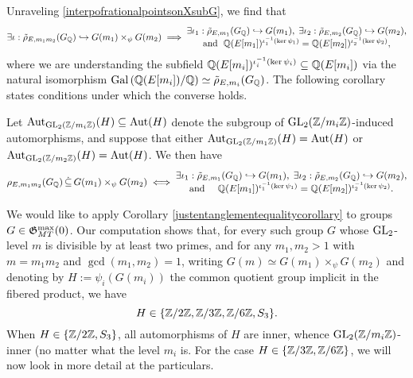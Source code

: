 Unraveling \eqref{interpofrationalpointsonXsubG}, we find that
\[
\exists \iota : \tilde{\rho}_{E,m_1m_2}(G_{\mathbb{Q}}) \hookrightarrow G(m_1) \times_\psi G(m_2) \; \Longrightarrow \; \begin{matrix} \exists \iota_1 : \tilde{\rho}_{E,m_1}(G_{\mathbb{Q}}) \hookrightarrow G(m_1), \; \exists \iota_2 : \tilde{\rho}_{E,m_2}(G_{\mathbb{Q}}) \hookrightarrow G(m_2), \\ \text{and } \; \mathbb{Q}(E[m_1])^{\iota_1^{-1}(\ker \psi_1)} = \mathbb{Q}(E[m_2])^{\iota_2^{-1}(\ker \psi_2)},\end{matrix}
\]
where we are understanding the subfield $\mathbb{Q}(E[m_i])^{\iota_i^{-1}(\ker \psi_i)} \subseteq \mathbb{Q}(E[m_i])$ via the natural isomorphism $\operatorname{Gal}\left( \mathbb{Q}(E[m_i])/\mathbb{Q} \right) \simeq \tilde{\rho}_{E,m_i}(G_{\mathbb{Q}})$.
The following corollary states conditions under which the converse holds. 
\begin{cor} \label{justentanglementequalitycorollary}
Let $\operatorname{Aut}_{\operatorname{GL}_2(\mathbb{Z}/m_i\mathbb{Z})}(H) \subseteq \operatorname{Aut}(H)$ denote the subgroup of $\operatorname{GL}_2(\mathbb{Z}/m_i\mathbb{Z})$-induced automorphisms, and suppose that either $\operatorname{Aut}_{\operatorname{GL}_2(\mathbb{Z}/m_1\mathbb{Z})}(H) = \operatorname{Aut}(H)$ or $\operatorname{Aut}_{\operatorname{GL}_2(\mathbb{Z}/m_2\mathbb{Z})}(H) = \operatorname{Aut}(H)$.  We then have
\[
\rho_{E,m_1m_2}(G_{\mathbb{Q}}) \, \dot\subseteq \, G(m_1) \times_\psi G(m_2) \; \Longleftrightarrow \; \begin{matrix} \exists \iota_1 : \tilde{\rho}_{E,m_1}(G_{\mathbb{Q}}) \hookrightarrow G(m_1), \; \exists \iota_2 : \tilde{\rho}_{E,m_2}(G_{\mathbb{Q}}) \hookrightarrow G(m_2), \\ \text{and } \quad \mathbb{Q}(E[m_1])^{\iota_1^{-1}(\ker \psi_1)} = \mathbb{Q}(E[m_2])^{\iota_2^{-1}(\ker \psi_2)}. \end{matrix}
\]
\end{cor}
We would like to apply Corollary \ref{justentanglementequalitycorollary} to groups $G \in \mathfrak{G}_{MT}^{\max}(0)$.  Our computation shows that, for every such group $G$ whose $\operatorname{GL}_2$-level $m$ is divisible by at least two primes, and for any $m_1, m_2 > 1$ with $m = m_1m_2$ and $\gcd(m_1,m_2) = 1$, writing $G(m) \simeq G(m_1) \times_{\psi} G(m_2)$ and denoting by $H := \psi_i(G(m_i))$ the common quotient group implicit in the fibered product, we have
\begin{equation} \label{formsofH}
H \in \{ \mathbb{Z}/2\mathbb{Z}, \mathbb{Z}/3\mathbb{Z}, \mathbb{Z}/6\mathbb{Z}, S_3 \}.
\end{equation}
When $H \in \{ \mathbb{Z}/2\mathbb{Z}, S_3 \}$, all automorphisms of $H$ are inner, whence $\operatorname{GL}_2(\mathbb{Z}/m_i\mathbb{Z})$-inner (no matter what the level $m_i$ is.  For the case $H \in \{ \mathbb{Z}/3\mathbb{Z}, \mathbb{Z}/6\mathbb{Z} \}$,  we will now look in more detail at the particulars.  

